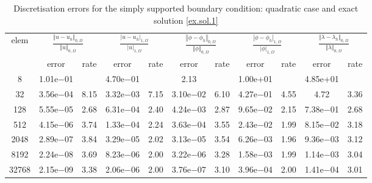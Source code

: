 \documentclass[a4paper,final]{siamltex}
\begin{document}
\begin{table}[htb!]
	\centering
	\caption{Discretisation errors  for the simply supported boundary condition: quadratic case and exact solution \eqref{ex.sol.1}}
	\begin{tabular}{|c|cc|cc|cc|cc|cc|}
		\hline
		\multirow{2}{*}{elem} & \multicolumn{2}{c|}{$\frac{\left\Vert u - u_h\right\Vert_{0,\Omega}}{\left\Vert u\right\Vert_{0,\Omega}}$} & \multicolumn{2}{c|}{$\frac{| u - u_h|_{1,\Omega}}{|u|_{1,\Omega}}$} & \multicolumn{2}{c|}{$\frac{\left\Vert \phi - \phi_h\right\Vert_{0,\Omega}}{\left\Vert \phi\right\Vert_{0,\Omega}}$} & \multicolumn{2}{c|}{$\frac{|\phi - \phi_h|_{1,\Omega}}{| \phi|_{1,\Omega}}$} & \multicolumn{2}{c|}{$\frac{\left\Vert \lambda - \lambda_h\right\Vert_{0,\Omega}}{\left\Vert \lambda\right\Vert_{0,\Omega}}$}\\ \hhline{~----------}
		& error & rate & error & rate & error & rate & error & rate & error & rate \\\hline
  8 & 1.01e$-$01 &   & 4.70e$-$01 &   & 2.13 &          & 1.00e+01 &          & 4.85e+01 &          \\\hline
   32 & 3.56e$-$04 & 8.15 & 3.32e$-$03 & 7.15 & 3.10e$-$02 & 6.10 & 4.27e$-$01 & 4.55 & 4.72 & 3.36 \\\hline
  128 & 5.55e$-$05 & 2.68 & 6.31e$-$04 & 2.40 & 4.24e$-$03 & 2.87 & 9.65e$-$02 & 2.15 & 7.38e$-$01 & 2.68 \\\hline
  512 & 4.15e$-$06 & 3.74 & 1.33e$-$04 & 2.24 & 3.63e$-$04 & 3.55 & 2.43e$-$02 & 1.99 & 8.15e$-$02 & 3.18 \\\hline
 2048 & 2.89e$-$07 & 3.84 & 3.29e$-$05 & 2.02 & 3.13e$-$05 & 3.54 & 6.26e$-$03 & 1.96 & 9.36e$-$03 & 3.12 \\\hline
 8192 & 2.24e$-$08 & 3.69 & 8.23e$-$06 & 2.00 & 3.22e$-$06 & 3.28 & 1.58e$-$03 & 1.99 & 1.14e$-$03 & 3.04 \\\hline
32768 & 2.15e$-$09 & 3.38 & 2.06e$-$06 & 2.00 & 3.76e$-$07 & 3.10 & 3.96e$-$04 & 2.00 & 1.41e$-$04 & 3.01 \\\hline
		
	\end{tabular}
	\label{ss1:quadratic}
\end{table}

 
\end{document}
